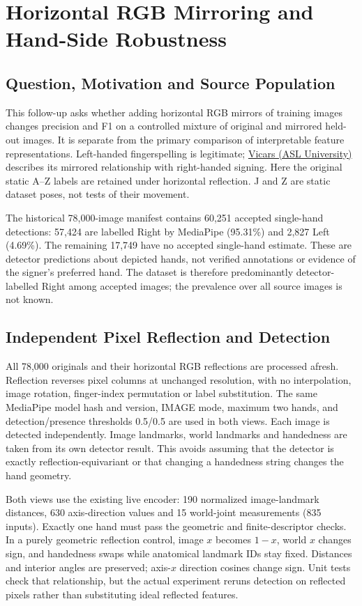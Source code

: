 \section{Horizontal RGB Mirroring and Hand-Side Robustness}\label{app:mirror}
\subsection{Question, Motivation and Source Population}
This follow-up asks whether adding horizontal RGB mirrors of training images changes precision and F1 on a controlled mixture of original and mirrored held-out images. It is separate from the primary comparison of interpretable feature representations. Left-handed fingerspelling is legitimate; \href{https://www.lifeprint.com/asl101/pages-layout/lefthandedsigners.htm}{Vicars (ASL University)} describes its mirrored relationship with right-handed signing. Here the original static A--Z labels are retained under horizontal reflection. J and Z are static dataset poses, not tests of their movement.

The historical 78,000-image manifest contains 60,251 accepted single-hand detections: 57,424 are labelled Right by MediaPipe (95.31\%) and 2,827 Left (4.69\%). The remaining 17,749 have no accepted single-hand estimate. These are detector predictions about depicted hands, not verified annotations or evidence of the signer's preferred hand. The dataset is therefore predominantly detector-labelled Right among accepted images; the prevalence over all source images is not known.

\subsection{Independent Pixel Reflection and Detection}
All 78,000 originals and their horizontal RGB reflections are processed afresh. Reflection reverses pixel columns at unchanged resolution, with no interpolation, image rotation, finger-index permutation or label substitution. The same MediaPipe model hash and version, IMAGE mode, maximum two hands, and detection/presence thresholds 0.5/0.5 are used in both views. Each image is detected independently. Image landmarks, world landmarks and handedness are taken from its own detector result. This avoids assuming that the detector is exactly reflection-equivariant or that changing a handedness string changes the hand geometry.

Both views use the existing live encoder: 190 normalized image-landmark distances, 630 axis-direction values and 15 world-joint measurements (835 inputs). Exactly one hand must pass the geometric and finite-descriptor checks. In a purely geometric reflection control, image $x$ becomes $1-x$, world $x$ changes sign, and handedness swaps while anatomical landmark IDs stay fixed. Distances and interior angles are preserved; axis-$x$ direction cosines change sign. Unit tests check that relationship, but the actual experiment reruns detection on reflected pixels rather than substituting ideal reflected features.

